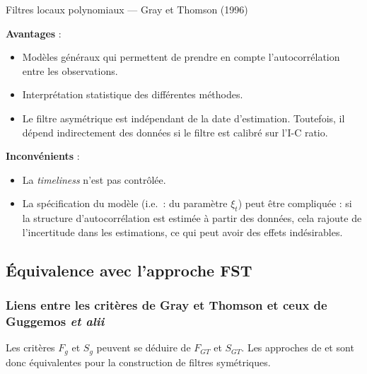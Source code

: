 \documentclass[
  11pt,
  french,
  a4paper]{article}
\newcommand\1{\mathds{1}}
\begin{document}
\begin{summary_box}{Filtres locaux polynomiaux --- Gray et Thomson (1996)}

\textbf{Avantages} :

\begin{itemize}
\item
  Modèles généraux qui permettent de prendre en compte l'autocorrélation entre les observations.
\item
  Interprétation statistique des différentes méthodes.
\item
  Le filtre asymétrique est indépendant de la date d'estimation.
  Toutefois, il dépend indirectement des données si le filtre est calibré sur l'I-C ratio.
\end{itemize}

\textbf{Inconvénients} :

\begin{itemize}
\item
  La \emph{timeliness} n'est pas contrôlée.
\item
  La spécification du modèle (i.e.~: du paramètre \(\xi_t\)) peut être compliquée : si la structure d'autocorrélation est estimée à partir des données, cela rajoute de l'incertitude dans les estimations, ce qui peut avoir des effets indésirables.
\end{itemize}

\end{summary_box}

\hypertarget{subsec-equivlpfst}{%
\subsection{Équivalence avec l'approche FST}\label{subsec-equivlpfst}}

\hypertarget{liens-entre-les-crituxe8res-de-gray-et-thomson-et-ceux-de-guggemos-et-alii}{%
\subsubsection{\texorpdfstring{Liens entre les critères de Gray et Thomson et ceux de Guggemos \emph{et alii}}{Liens entre les critères de Gray et Thomson et ceux de Guggemos et alii}}\label{liens-entre-les-crituxe8res-de-gray-et-thomson-et-ceux-de-guggemos-et-alii}}

Les critères \(F_g\) et \(S_g\) peuvent se déduire de \(F_{GT}\) et \(S_{GT}\).
Les approches de \textcite{GrayThomson1996} et \textcite{ch15HBSA} sont donc équivalentes pour la construction de filtres symétriques.
\end{document}
